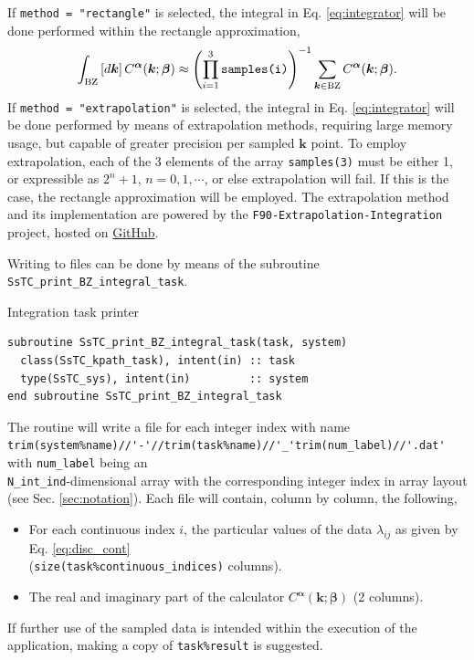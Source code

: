 \documentclass[10pt,a4paper]{article}
\begin{document}
If \verb|method = "rectangle"| is selected, the integral in Eq. \eqref{eq:integrator} will be done performed within the rectangle approximation,
\begin{equation}
\int_{\text{BZ}} \left[d\bm{k}\right]C^{\bm{\alpha}}(\bm{k}; \bm{\beta}) \approx \left(\prod_{i=1}^3 \verb|samples(i)|\right)^{-1}\sum_{\bm{k}\in\text{BZ}} C^{\bm{\alpha}}(\bm{k}; \bm{\beta}).
\end{equation}
If \verb|method = "extrapolation"| is selected, the integral in Eq. \eqref{eq:integrator} will be done performed by means of extrapolation methods, requiring large memory usage, but capable of greater precision per sampled $\bm{k}$ point. To employ extrapolation, each of the 3 elements of the array \verb|samples(3)| must be either 1, or expressible as $2^n + 1$, $n = 0, 1, \cdots$, or else extrapolation will fail. If this is the case, the rectangle approximation will be employed. The extrapolation method and its implementation are powered by the \verb|F90-Extrapolation-Integration| project, hosted on \href{https://github.com/irukoa/F90-Extrapolation-Integration}{GitHub}.

Writing to files can be done by means of the subroutine \verb|SsTC_print_BZ_integral_task|.
\begin{codebox}{Integration task printer}
\begin{lstlisting}[caption={Interface of the integrator task printer.},captionpos=b]
subroutine SsTC_print_BZ_integral_task(task, system)
  class(SsTC_kpath_task), intent(in) :: task
  type(SsTC_sys), intent(in)         :: system
end subroutine SsTC_print_BZ_integral_task
\end{lstlisting}
\end{codebox}
The routine will write a file for each integer index with name \\ \verb|trim(system%name)//'-'//trim(task%name)//'_'trim(num_label)//'.dat'| with \verb|num_label| being an \\ \verb|N_int_ind|-dimensional array with the corresponding integer index in array layout (see Sec. \ref{sec:notation}). Each file will contain, column by column, the following,
\begin{tcolorbox}
\begin{itemize}
\item For each continuous index $i$, the particular values of the data $\lambda_{ij}$ as given by Eq. \eqref{eq:disc_cont} \\ (\verb|size(task%continuous_indices)| columns).
\item The real and imaginary part of the calculator $C^{\bm{\alpha}}(\bm{k}; \bm{\beta})$ (2 columns).
\end{itemize}
\end{tcolorbox}
If further use of the sampled data is intended within the execution of the application, making a copy of \verb|task%result| is suggested.
\end{document}
